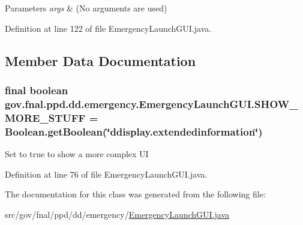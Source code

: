 \begin{DoxyParams}{Parameters}
{\em args} & (No arguments are used) \\
\hline
\end{DoxyParams}


Definition at line 122 of file Emergency\-Launch\-G\-U\-I.\-java.



\subsection{Member Data Documentation}
\hypertarget{classgov_1_1fnal_1_1ppd_1_1dd_1_1emergency_1_1EmergencyLaunchGUI_a38b676d30b6ac1c12dbc4b790f93b729}{
\subsubsection[{S\-H\-O\-W\-\_\-\-M\-O\-R\-E\-\_\-\-S\-T\-U\-F\-F}]{\setlength{\rightskip}{0pt plus 5cm}final boolean gov.\-fnal.\-ppd.\-dd.\-emergency.\-Emergency\-Launch\-G\-U\-I.\-S\-H\-O\-W\-\_\-\-M\-O\-R\-E\-\_\-\-S\-T\-U\-F\-F = Boolean.\-get\-Boolean(\char`\"{}ddisplay.\-extendedinformation\char`\"{})\hspace{0.3cm}{\ttfamily [static]}}}\label{classgov_1_1fnal_1_1ppd_1_1dd_1_1emergency_1_1EmergencyLaunchGUI_a38b676d30b6ac1c12dbc4b790f93b729}
Set to true to show a more complex U\-I 

Definition at line 76 of file Emergency\-Launch\-G\-U\-I.\-java.



The documentation for this class was generated from the following file\-:\begin{DoxyCompactItemize}
\item 
src/gov/fnal/ppd/dd/emergency/\hyperlink{EmergencyLaunchGUI_8java}{Emergency\-Launch\-G\-U\-I.\-java}\end{DoxyCompactItemize}
